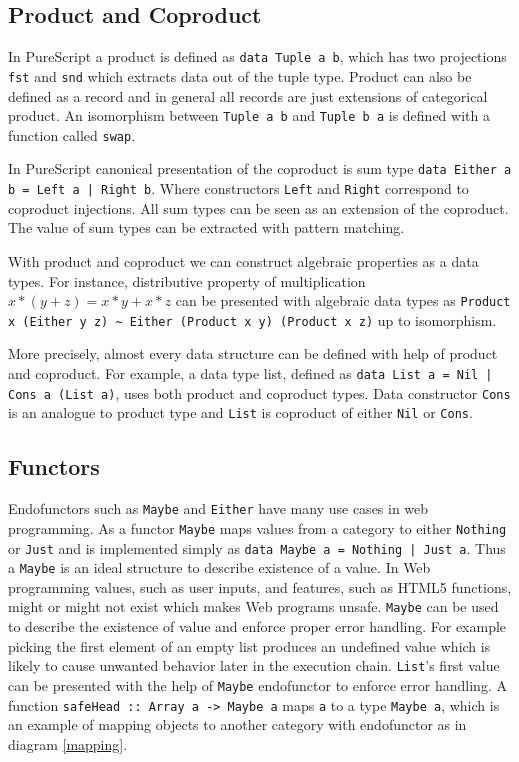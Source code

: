 \documentclass[article]{aaltoseries}
\begin{document}
  \subsection{Product and Coproduct}
    In PureScript a product is defined as \lstinline|data Tuple a b|, which has
    two projections \lstinline|fst| and \lstinline|snd| which extracts data out
    of the tuple type. Product can also be defined as a record and in general
    all records are just extensions of categorical product. An isomorphism
    between \lstinline|Tuple a b| and \lstinline|Tuple b a| is defined with a
    function called \lstinline|swap|.
    
    In PureScript canonical presentation of the coproduct is sum type
    \lstinline{data Either a b = Left a | Right b}. Where constructors
    \lstinline|Left| and \lstinline|Right| correspond to coproduct injections.
    All sum types can be seen as an extension of the coproduct. The value of sum
    types can be extracted with pattern matching.
    
    With product and coproduct we can construct algebraic properties as a data
    types. For instance, distributive property of multiplication $x * (y + z) =
    x * y + x * z$ can be presented with algebraic data types as
    \lstinline|Product x (Either y z) ~ Either (Product x y) (Product x z)| up
    to isomorphism.

    More precisely, almost every data structure can be defined with help of
    product and coproduct. For example, a data type list, defined as
    \lstinline{data List a = Nil | Cons a (List a)}, uses both product and
    coproduct types. Data constructor \lstinline|Cons| is an analogue to product
    type and \lstinline|List| is coproduct of either \lstinline|Nil| or \lstinline|Cons|.

    

  \subsection{Functors}
    Endofunctors such as \lstinline|Maybe| and \lstinline|Either| have many use
    cases in web programming. As a functor \lstinline|Maybe| maps values from a
    category to either \lstinline|Nothing| or \lstinline|Just| and is
    implemented simply as \lstinline{data Maybe a = Nothing | Just a}. Thus a
    \lstinline|Maybe| is an ideal structure to describe existence of a value. In
    Web programming values, such as user inputs, and features, such as HTML5
    functions, might or might not exist which makes Web programs unsafe.
    \lstinline|Maybe| can be used to describe the existence of value and enforce
    proper error handling. For example picking the first element of an empty
    list produces an undefined value which is likely to cause unwanted behavior
    later in the execution chain. \lstinline|List|'s first value can be
    presented with the help of \lstinline|Maybe| endofunctor to enforce error
    handling. A function \lstinline|safeHead :: Array a -> Maybe a| maps
    \lstinline|a| to a type \lstinline|Maybe a|, which is an example of mapping
    objects to another category with endofunctor as in diagram \ref{mapping}.
\end{document}
